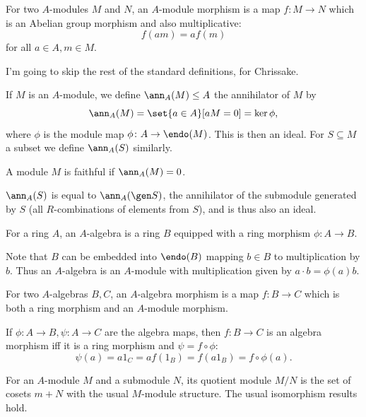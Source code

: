 \bdefn

    For two $A$-modules $M$ and $N$, an {\emphcolor $A$-module morphism} is a map $f\colon M\to N$ which is an Abelian group morphism and also
    multiplicative:
    $$ f(am) = af(m) $$
    for all $a\in A,m\in M$.

\edefn

\bnote

    I'm going to skip the rest of the standard definitions, for Chrissake.

\enote

\bdefn

    If $M$ is an $A$-module, we define $\ann_A(M)\leq A$ the {\emphcolor annihilator} of $M$ by
    $$ \ann_A(M) = \set{a\in A}[aM=0] = \ker\phi , $$
    where $\phi$ is the module map $\phi\colon A\to\endo(M)$.
    This is then an ideal.
    For $S\subseteq M$ a subset we define $\ann_A(S)$ similarly.

    A module $M$ is {\emphcolor faithful} if $\ann_A(M)=0$.

\edefn

$\ann_A(S)$ is equal to $\ann_A(\gen S)$, the annihilator of the submodule generated by $S$ (all $R$-combinations of elements from $S$),
and is thus also an ideal.

\bdefn

    For a ring $A$, an {\emphcolor $A$-algebra} is a ring $B$ equipped with a ring morphism $\phi\colon A\to B$.

\edefn

Note that $B$ can be embedded into $\endo(B)$ mapping $b\in B$ to multiplication by $b$.
Thus an $A$-algebra is an $A$-module with multiplication given by $a\cdot b=\phi(a)b$.

\bdefn

    For two $A$-algebras $B,C$, an {\emphcolor $A$-algebra morphism} is a map $f\colon B\to C$ which is both a ring morphism and an
    $A$-module morphism.

\edefn

If $\phi\colon A\to B,\psi\colon A\to C$ are the algebra maps, then $f\colon B\to C$ is an algebra morphism iff it is a ring morphism and
$\psi=f\circ\phi$:
$$ \psi(a) = a1_C = af(1_B) = f(a1_B) = f\circ\phi(a) . $$

\bdefn

    For an $A$-module $M$ and a submodule $N$, its quotient module $M/N$ is the set of cosets $m+N$ with the usual $M$-module structure.
    The usual isomorphism results hold.

\edefn

